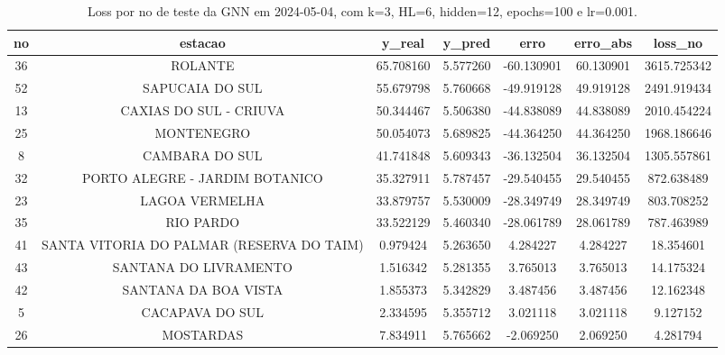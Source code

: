 \begin{table}[h]
\centering
\caption{Loss por no de teste da GNN em 2024-05-04, com k=3, HL=6, hidden=12, epochs=100 e lr=0.001.}
\label{tab:gnn_loss_k3_hl6_h12_e100_d20240504}
\begin{tabular}{ccccccc}
\toprule
no & estacao & y\_real & y\_pred & erro & erro\_abs & loss\_no \\
\midrule
36 & ROLANTE & 65.708160 & 5.577260 & -60.130901 & 60.130901 & 3615.725342 \\
52 & SAPUCAIA DO SUL & 55.679798 & 5.760668 & -49.919128 & 49.919128 & 2491.919434 \\
13 & CAXIAS DO SUL - CRIUVA & 50.344467 & 5.506380 & -44.838089 & 44.838089 & 2010.454224 \\
25 & MONTENEGRO & 50.054073 & 5.689825 & -44.364250 & 44.364250 & 1968.186646 \\
8 & CAMBARA DO SUL & 41.741848 & 5.609343 & -36.132504 & 36.132504 & 1305.557861 \\
32 & PORTO ALEGRE - JARDIM BOTANICO & 35.327911 & 5.787457 & -29.540455 & 29.540455 & 872.638489 \\
23 & LAGOA VERMELHA & 33.879757 & 5.530009 & -28.349749 & 28.349749 & 803.708252 \\
35 & RIO PARDO & 33.522129 & 5.460340 & -28.061789 & 28.061789 & 787.463989 \\
41 & SANTA VITORIA DO PALMAR (RESERVA DO TAIM) & 0.979424 & 5.263650 & 4.284227 & 4.284227 & 18.354601 \\
43 & SANTANA DO LIVRAMENTO & 1.516342 & 5.281355 & 3.765013 & 3.765013 & 14.175324 \\
42 & SANTANA DA BOA VISTA & 1.855373 & 5.342829 & 3.487456 & 3.487456 & 12.162348 \\
5 & CACAPAVA DO SUL & 2.334595 & 5.355712 & 3.021118 & 3.021118 & 9.127152 \\
26 & MOSTARDAS & 7.834911 & 5.765662 & -2.069250 & 2.069250 & 4.281794 \\
\bottomrule
\end{tabular}
\end{table}
